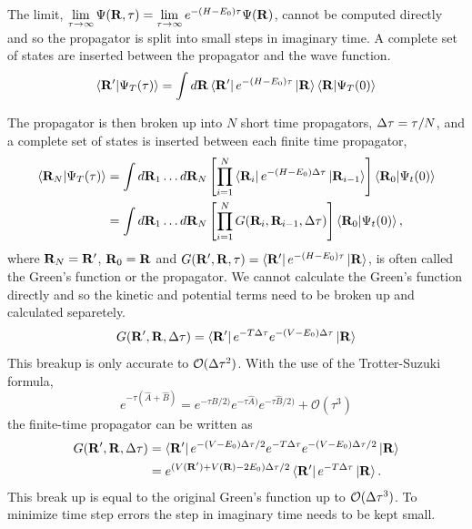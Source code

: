 The limit, $\lim\limits_{\tau\rightarrow\infty}\Psi(\mathbf{R},\tau) = \lim\limits_{\tau\rightarrow\infty}e^{-(H-E_0)\tau}\Psi(\mathbf{R})$, cannot be computed directly and so the propagator is split into small steps in imaginary time. A complete set of states are inserted between the propagator and the wave function.
\begin{equation}
   \left< \mathbf{R}' | \Psi_T(\tau) \right> = \int d\mathbf{R} \left< \mathbf{R}' \right|e^{-(H-E_0)\tau}\left| \mathbf{R} \right>\left< \mathbf{R} | \Psi_T(0) \right>
\end{equation}

The propagator is then broken up into $N$ short time propagators, $\Delta\tau = \tau/N$, and a complete set of states is inserted between each finite time propagator,
\begin{align}
   \left< \mathbf{R}_N | \Psi_T(\tau) \right> &= \int d\mathbf{R}_1 \ldots d\mathbf{R}_N \left[\prod\limits_{i=1}^N \left< \mathbf{R}_i \right|e^{-(H-E_0)\Delta\tau}\left| \mathbf{R}_{i-1} \right>\right] \left< \mathbf{R}_0 | \Psi_t(0) \right> \\
   &= \int d\mathbf{R}_1 \ldots d\mathbf{R}_N \left[\prod\limits_{i=1}^N G(\mathbf{R}_i,\mathbf{R}_{i-1},\Delta\tau)\right] \left< \mathbf{R}_0 | \Psi_t(0) \right>,
\end{align}
where $\mathbf{R}_N=\mathbf{R}'$, $\mathbf{R}_0=\mathbf{R}$ and $G(\mathbf{R}',\mathbf{R},\tau)=\left< \mathbf{R}' \right|e^{-(H-E_0)\tau}\left| \mathbf{R} \right>$, is often called the Green's function or the propagator. We cannot calculate the Green's function directly and so the kinetic and potential terms need to be broken up and calculated separetely.
\begin{equation}
   G(\mathbf{R}',\mathbf{R},\Delta\tau) = \left< \mathbf{R}' \right|e^{-T\Delta\tau}e^{-(V-E_0)\Delta\tau}\left| \mathbf{R} \right>
\end{equation}
This breakup is only accurate to $\mathcal{O}(\Delta\tau^2)$. With the use of the Trotter-Suzuki formula,
\begin{equation}
   e^{-\tau\left(\hat{A}+\hat{B}\right)} = e^{-\tau\hat{B}/2)}e^{-\tau\hat{A})}e^{-\tau\hat{B}/2)} + \mathcal{O}(\tau^3)
\end{equation}
the finite-time propagator can be written as
\begin{align}
   G(\mathbf{R}',\mathbf{R},\Delta\tau) &= \left< \mathbf{R}' \right|e^{-(V-E_0)\Delta\tau/2}e^{-T\Delta\tau}e^{-(V-E_0)\Delta\tau/2}\left| \mathbf{R} \right> \\
   &= e^{(V(\mathbf{R}')+V(\mathbf{R})-2E_0)\Delta\tau/2}\left< \mathbf{R}' \right|e^{-T\Delta\tau}\left| \mathbf{R} \right>.
\end{align}
This break up is equal to the original Green's function up to $\mathcal{O}(\Delta\tau^3)$. To minimize time step errors the step in imaginary time needs to be kept small.

